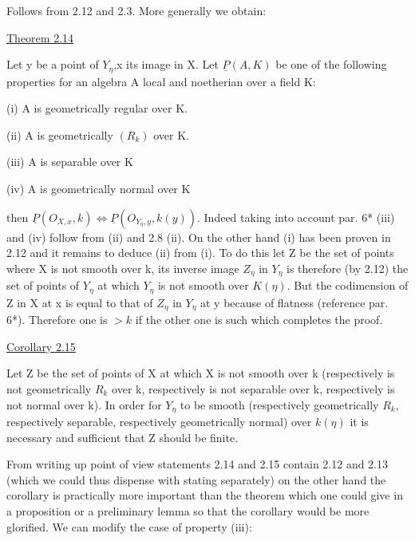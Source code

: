 \documentclass[11pt]{article}
\newcommand{\scanpage}[1]{\par\bigskip\noindent{\small\sffamily[scan #1]}\par}
\newcommand{\mspage}[1]{{\small\sffamily[p.\,#1]}}
\newcommand{\uline}[1]{\underline{#1}}
\begin{document}
Follows from 2.12 and 2.3. More generally we obtain:

\uline{Theorem 2.14}

Let y be a point of $Y_\eta$,x its image in X. Let $\underline{P}(A,K)$ be one of
the following properties for an algebra A local and noetherian
over a field K:

(i) A is geometrically regular over K.

(ii) A is geometrically $(R_k)$ over K.

(iii) A is separable over K

(iv) A is geometrically normal over K

\clearpage
\scanpage{24/17}
\mspage{17}

then $\underline{P}(O_{X,x}, k) \Leftrightarrow \underline{P}(O_{Y_\eta,y}, k(y))$. Indeed taking into account par.
6* (iii) and (iv) follow from (ii) and 2.8 (ii). On the other
hand (i) has been proven in 2.12 and it remains to deduce (ii)
from (i). To do this let Z be the set of points where X is not
smooth over k, its inverse image $Z_\eta$ in $Y_\eta$ is therefore (by 2.12)
the set of points of $Y_\eta$ at which $Y_\eta$ is not smooth over $K(\eta)$. But
the codimension of Z in X at x is equal to that of $Z_\eta$ in $Y_\eta$ at y
because of flatness (reference par. 6*). Therefore one is $>k$ if
the other one is such which completes the proof.

\uline{Corollary 2.15}

Let Z be the set of points of X at which X is not smooth over
k (respectively is not geometrically $R_k$ over k, respectively is not
separable over k, respectively is not normal over k). In order
for $Y_\eta$ to be smooth (respectively geometrically $R_k$, respectively
separable, respectively geometrically normal) over $k(\eta)$ it is
necessary and sufficient that Z should be finite.

From writing up point of view statements 2.14 and 2.15
contain 2.12 and 2.13 (which we could thus dispense with stating
separately) on the other hand the corollary is practically more
important than the theorem which one could give in a proposition
or a preliminary lemma so that the corollary would be more
glorified. We can modify the case of property (iii):
\end{document}
